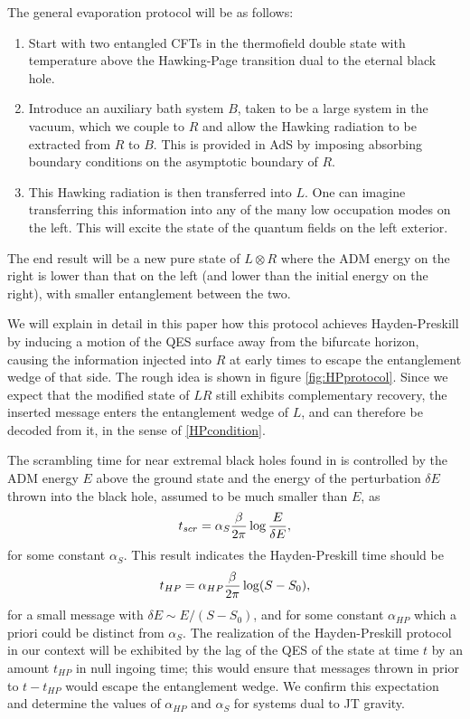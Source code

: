 \documentclass[12pt]{article}
\renewcommand{\ln}{\log}
\begin{document}
The general evaporation protocol will be as follows:
\begin{enumerate}
\item Start with two entangled CFTs in the thermofield double state with temperature above the Hawking-Page transition dual to the eternal black hole.
\item Introduce an auxiliary bath system $B$, taken to be a large system in the vacuum, which we couple to $R$ and allow the Hawking radiation to be extracted from $R$ to $B$. This is provided in AdS by imposing absorbing boundary conditions on the asymptotic boundary of $R$.
\item This Hawking radiation is then transferred into $L$. One can imagine transferring this information into any of the many low occupation modes on the left. This will excite the state of the quantum fields on the left exterior.
\end{enumerate}
The end result will be a new pure state of $L\otimes R$ where the ADM energy on the right is lower than that on the left (and lower than the initial energy on the right), with smaller entanglement between the two.

We will explain in detail in this paper how this protocol achieves Hayden-Preskill by inducing a motion of the QES surface away from the bifurcate horizon, causing the information injected into $R$ at early times to escape the entanglement wedge of that side. The rough idea is shown in figure \ref{fig:HPprotocol}. Since we expect that the modified state of $LR$ still exhibits complementary recovery, the inserted message enters the entanglement wedge of $L$, and can therefore be decoded from it, in the sense of \eqref{HPcondition}.



The scrambling time for near extremal black holes found in \cite{Leichenauer:2014nxa} is controlled by the ADM energy $E$ above the ground state and the energy of the perturbation $\delta E$ thrown into the black hole, assumed to be much smaller than $E$, as
\begin{align}
t_{scr} = \alpha_S {\beta \over 2 \pi} \ln {E \over \delta E}, \label{tscr1}
\end{align}
for some constant $\alpha_S$. This result indicates the Hayden-Preskill time should be
\begin{align}
t_{HP} = \alpha_{HP} {\beta \over 2 \pi} \ln (S - S_0), \label{thp1}
\end{align}
for a small message with $\delta E \sim E/(S-S_0)$, and for some constant $\alpha_{HP}$ which a priori could be distinct from $\alpha_S$. The realization of the Hayden-Preskill protocol in our context will be exhibited by the lag of the QES of the state at time $t$ by an amount $t_{HP}$ in null ingoing time; this would ensure that messages thrown in prior to $t - t_{HP}$ would escape the entanglement wedge. We confirm this expectation and determine the values of $\alpha_{HP}$ and $\alpha_{S}$ for systems dual to JT gravity.
\end{document}

